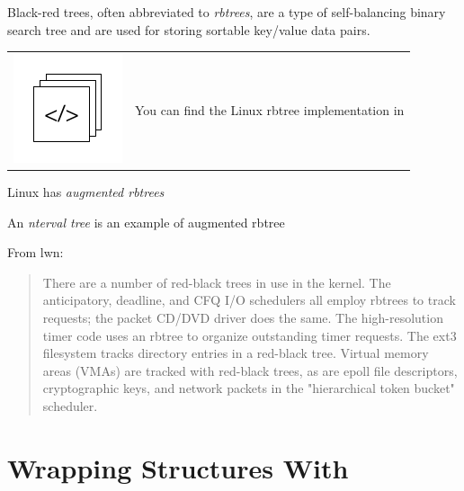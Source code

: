 Black-red trees, often abbreviated to \textit{rbtrees}, are a type of self-balancing binary search tree and are used for storing sortable key/value data pairs.

\begin{table}[h]
\begin{tabular}{ll}
\parbox[l]{0.6in}{\includegraphics[scale=0.8]{figures/src-xref.pdf}} & \parbox[l]{4in}{\small{You can find the Linux rbtree implementation in }}
\end{tabular}
\end{table}

\noindent
Linux has \textit{augmented rbtrees}

An \textit{nterval tree} is an example of augmented rbtree

From lwn:

\begin{quote}
There are a number of red-black trees in use in the kernel. The anticipatory, deadline, and CFQ I/O schedulers all employ rbtrees to track requests; the packet CD/DVD driver does the same. The high-resolution timer code uses an rbtree to organize outstanding timer requests. The ext3 filesystem tracks directory entries in a red-black tree. Virtual memory areas (VMAs) are tracked with red-black trees, as are epoll file descriptors, cryptographic keys, and network packets in the "hierarchical token bucket" scheduler.
\end{quote}


\section{Wrapping Structures With }\label{container-of}

%

